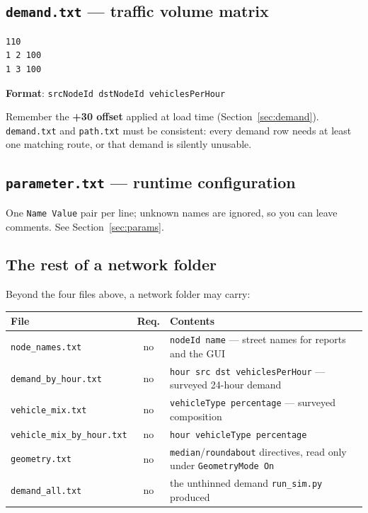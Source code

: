 \documentclass[11pt, a4paper]{article}
\newcommand{\code}[1]{\texttt{#1}}
\begin{document}
\subsection{\code{demand.txt} --- traffic volume matrix}

\begin{lstlisting}[caption=Sample demand.txt]
110
1 2 100
1 3 100
\end{lstlisting}

\textbf{Format}: \code{srcNodeId  dstNodeId  vehiclesPerHour}

Remember the \textbf{+30 offset} applied at load time
(Section~\ref{sec:demand}). \code{demand.txt} and \code{path.txt} must be
consistent: every demand row needs at least one matching route, or that demand is
silently unusable.

\subsection{\code{parameter.txt} --- runtime configuration}

One \code{Name Value} pair per line; unknown names are ignored, so you can leave
comments. See Section~\ref{sec:params}.

\subsection{The rest of a network folder}

Beyond the four files above, a network folder may carry:

\begin{center}
\begin{tabularx}{\textwidth}{l c X}
\toprule
\textbf{File} & \textbf{Req.} & \textbf{Contents} \\
\midrule
\code{node\_names.txt} & no & \code{nodeId name} --- street names for reports and the GUI \\
\code{demand\_by\_hour.txt} & no & \code{hour src dst vehiclesPerHour} --- surveyed 24-hour demand \\
\code{vehicle\_mix.txt} & no & \code{vehicleType percentage} --- surveyed composition \\
\code{vehicle\_mix\_by\_hour.txt} & no & \code{hour vehicleType percentage} \\
\code{geometry.txt} & no & \code{median}/\code{roundabout} directives, read only under \code{GeometryMode On} \\
\code{demand\_all.txt} & no & the unthinned demand \code{run\_sim.py} produced \\
\bottomrule
\end{tabularx}
\end{center}
\end{document}
